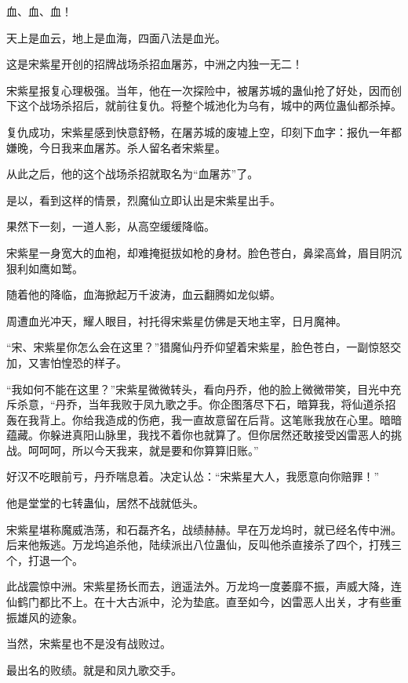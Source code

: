 
\begin{this_body}

血、血、血！

天上是血云，地上是血海，四面八法是血光。

这是宋紫星开创的招牌战场杀招血屠苏，中洲之内独一无二！

宋紫星报复心理极强。当年，他在一次探险中，被屠苏城的蛊仙抢了好处，因而创下这个战场杀招后，就前往复仇。将整个城池化为乌有，城中的两位蛊仙都杀掉。

复仇成功，宋紫星感到快意舒畅，在屠苏城的废墟上空，印刻下血字：报仇一年都嫌晚，今日我来血屠苏。杀人留名者宋紫星。

从此之后，他的这个战场杀招就取名为“血屠苏”了。

是以，看到这样的情景，烈魔仙立即认出是宋紫星出手。

果然下一刻，一道人影，从高空缓缓降临。

宋紫星一身宽大的血袍，却难掩挺拔如枪的身材。脸色苍白，鼻梁高耸，眉目阴沉狠利如鹰如鹫。

随着他的降临，血海掀起万千波涛，血云翻腾如龙似蟒。

周遭血光冲天，耀人眼目，衬托得宋紫星仿佛是天地主宰，日月魔神。

“宋、宋紫星你怎么会在这里？”猎魔仙丹乔仰望着宋紫星，脸色苍白，一副惊怒交加，又害怕惶恐的样子。

“我如何不能在这里？”宋紫星微微转头，看向丹乔，他的脸上微微带笑，目光中充斥杀意，“丹乔，当年我败于凤九歌之手。你企图落尽下石，暗算我，将仙道杀招轰在我背上。你给我造成的伤疤，我一直故意留在后背。这笔账我放在心里。暗暗蕴藏。你躲进真阳山脉里，我找不着你也就算了。但你居然还敢接受凶雷恶人的挑战。呵呵呵，所以今天我来，就是要和你算算旧账。”

好汉不吃眼前亏，丹乔喘息着。决定认怂：“宋紫星大人，我愿意向你赔罪！”

他是堂堂的七转蛊仙，居然不战就低头。

宋紫星堪称魔威浩荡，和石磊齐名，战绩赫赫。早在万龙坞时，就已经名传中洲。后来他叛逃。万龙坞追杀他，陆续派出八位蛊仙，反叫他杀直接杀了四个，打残三个，打退一个。

此战震惊中洲。宋紫星扬长而去，逍遥法外。万龙坞一度萎靡不振，声威大降，连仙鹤门都比不上。在十大古派中，沦为垫底。直至如今，凶雷恶人出关，才有些重振雄风的迹象。

当然，宋紫星也不是没有战败过。

最出名的败绩。就是和凤九歌交手。


\end{this_body}
